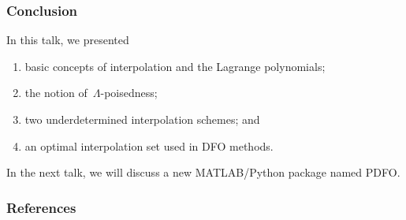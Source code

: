 \documentclass{polyu-presentation}
\begin{document}
\begin{frame}
    \frametitle{Conclusion}
    
    In this talk, we presented
    \begin{enumerate}
        \item basic \alert{concepts of interpolation} and the \alert{Lagrange polynomials};
        \item the notion of~\alert{$\Lambda$-poisedness};
        \item two \alert{underdetermined interpolation} schemes; and
        \item an \alert{optimal interpolation set} used in DFO methods.
    \end{enumerate}

    \bigskip

    In the next talk, we will discuss a new MATLAB/Python package named \alert{PDFO}.
\end{frame}

\appendix

\begin{frame}[t]
    \frametitle{References}

	\printbibliography
\end{frame}
\end{document}
